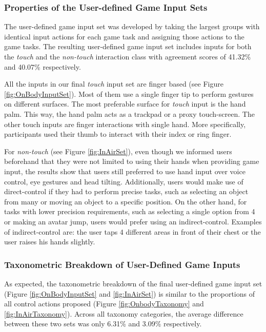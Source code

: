 \documentclass{sigchi}
\begin{document}
   \subsubsection{Properties of the User-defined Game Input Sets}
   The user-defined game input set was developed by taking the largest groups with identical input actions for each game task and assigning those actions to the game tasks. 
   The resulting user-defined game input set includes inputs for both the \emph{touch} and the \emph{non-touch} interaction class with agreement scores of 41.32\% and 40.07\% respectively. 

      All the inputs in our final \emph{touch} input set are finger based (see Figure \ref{fig:OnBodyInputSet}). Most of them use a single finger tip to perform gestures on different surfaces. The most preferable surface for \emph{touch} input is the hand palm. This way, the hand palm acts as a trackpad or a proxy touch-screen. The other touch inputs are finger interactions with single hand. More specifically, participants used their thumb to interact with their index or ring finger.

   For \emph{non-touch} (see Figure \ref{fig:InAirSet}), even though we informed users beforehand that they were not limited to using their hands when providing game input, the results show that users still preferred to use hand input over voice control, eye gestures and head tilting. Additionally, users would make use of direct-control if they had to perform precise tasks, such as selecting an object from many or moving an object to a specific position. On the other hand, for tasks with lower precision requirements, such as selecting a single option from 4 or making an avatar jump, users would prefer using an indirect-control. Examples of indirect-control are: the user taps 4 different areas in front of their chest or the user raises his hands slightly.


 

   \subsubsection{Taxonometric Breakdown of User-Defined Game Inputs}
   As expected, the taxonometric breakdown of the final user-defined game input set (Figure \ref{fig:OnBodyInputSet} and \ref{fig:InAirSet}) is similar to the proportions of all control actions proposed (Figure \ref{fig:OnbodyTaxonomy} and \ref{fig:InAirTaxonomy}). Across all taxonomy categories, the average difference between these two sets was only 6.31\% and 3.09\% respectively.
\end{document}
